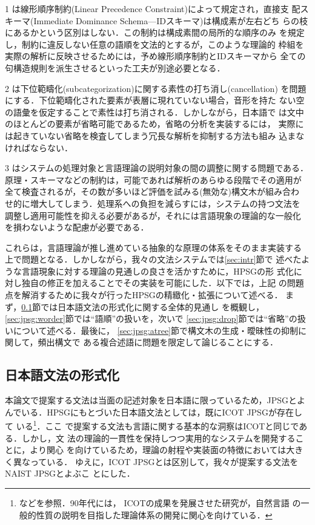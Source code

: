 1 は線形順序制約(Linear Precedence Constraint)によって規定され，直接支
配スキーマ(Immediate Dominance Schema---IDスキーマ)は構成素が左右どち
らの枝にあるかという区別はしない．この制約は構成素間の局所的な順序のみ
を規定し，制約に違反しない任意の語順を文法的とするが，このような理論的
枠組を実際の解析に反映させるためには，予め線形順序制約とIDスキーマから
全ての句構造規則を派生させるといった工夫が別途必要となる．

2 は下位範疇化(subcategorization)に関する素性の打ち消し(cancellation) 
を問題にする．下位範疇化された要素が表層に現れていない場合，音形を持た
ない空の語彙を仮定することで素性は打ち消される．しかしながら，日本語で
は文中のほとんどの要素が省略可能であるため，省略の分析を実装するには，
実際には起きていない省略を検査してしまう冗長な解析を抑制する方法も組み
込まなければならない．

3 はシステムの処理対象と言語理論の説明対象の間の調整に関する問題である．
原理・スキーマなどの制約は，可能であれば解析のあらゆる段階でその適用が
全て検査されるが，その数が多いほど評価を試みる(無効な)構文木が組み合わ
せ的に増大してしまう．処理系への負担を減らすには，システムの持つ文法を
調整し適用可能性を抑える必要があるが，それには言語現象の理論的な一般化
を損わないような配慮が必要である．

これらは，言語理論が推し進めている抽象的な原理の体系をそのまま実装する
上で問題となる．しかしながら，我々の文法システムでは\ref{sec:intr}節で
述べたような言語現象に対する理論の見通しの良さを活かすために，HPSGの形
式化に対し独自の修正を加えることでその実装を可能にした．以下では，上記
の問題点を解消するために我々が行ったHPSGの精緻化・拡張について述べる．
まず，\ref{sec:jpsg:frml}節では日本語文法の形式化に関する全体的見通し
を概観し，\ref{sec:jpsg:worder}節では``語順''の扱いを，次いで
\ref{sec:jpsg:drop}節では``省略''の扱いについて述べる．最後に，
\ref{sec:jpsg:atree}節で構文木の生成・曖昧性の抑制に関して，頻出構文で
ある複合述語に問題を限定して論じることにする．


\subsection{日本語文法の形式化}\label{sec:jpsg:frml}

本論文で提案する文法は当面の記述対象を日本語に限っているため，JPSGとよ
んでいる．HPSGにもとづいた日本語文法としては，既にICOT JPSGが存在して
いる\footnote{などを参照．90年代には，
ICOTの成果を発展させた研究\cite{郡司1994,Gunji&Hasida1998}が，自然言語
の一般的性質の説明を目指した理論体系の開発に関心を向けている．}．ここ
で提案する文法も言語に関する基本的な洞察はICOTと同じである．しかし，文
法の理論的一貫性を保持しつつ実用的なシステムを開発することに，より関心
を向けているため，理論の射程や実装面の特徴においては大きく異なっている．
ゆえに，ICOT JPSGとは区別して，我々が提案する文法をNAIST JPSGとよぶこ
とにした．

